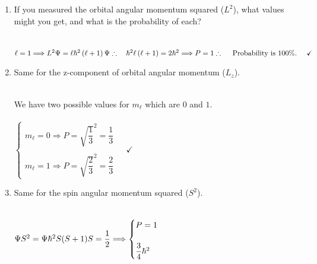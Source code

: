 \documentclass[fleqn]{article}
\begin{document}
\begin{enumerate}
    \begin{enumerate}
      \item If you measured the orbital angular momentum squared ($L^2$), what values might you get,
      and what is the probability of each?

        \textcolor{hwColor}{
          \\
          $
            \ell=1 \Longrightarrow L^2 \Psi=\ell \hbar^2 \left(\ell+1\right) \Psi
            \\
            \\
            \therefore ~~~ \hbar^2 \ell \left(\ell+1\right)=2 \hbar^2 \Longrightarrow P=1
            \\
            \\
            \therefore ~~~~ \text{Probability is $100\%$}. ~~~~ \checkmark
          $
          \\
        }

      \item Same for the z-component of orbital angular momentum ($L_z$).

        \textcolor{hwColor}{
          \\
          We have two possible values for $m_{\ell}$ which are $0$ and $1$.
          \\
          \\
          $
            \begin{cases}
              m_{\ell}=0 \Longrightarrow P=\sqrt{\dfrac{1}{3}}^2=\dfrac{1}{3}
              \\
              \\
              m_{\ell}=1 \Longrightarrow P=\sqrt{\dfrac{2}{3}}^2=\dfrac{2}{3}
            \end{cases} ~~~~~ \checkmark
          $
          \\
        }

      \item Same for the spin angular momentum squared ($S^2$).

        \textcolor{hwColor}{
          \\
          $
            \Psi S^2=\Psi \hbar^2 S(S+1)
            \\
            \\
            S=\dfrac{1}{2} \Longrightarrow \begin{cases}
              P=1
              \\
              \\
              \dfrac{3}{4} \hbar^2
            \end{cases}
          $
          \\
        }


\end{enumerate}
\end{enumerate}
\end{document}
